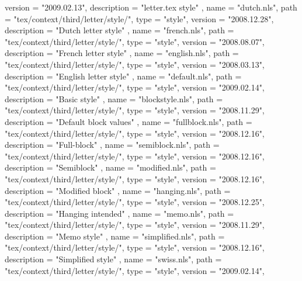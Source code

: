 {{        version     = "2009.02.13",
        description = "letter.tex style"
    } ,
    {
        name        = "dutch.nls",
        path        = "tex/context/third/letter/style/",
        type        = "style",
        version     = "2008.12.28",
        description = "Dutch letter style"
    } ,
    {
        name        = "french.nls",
        path        = "tex/context/third/letter/style/",
        type        = "style",
        version     = "2008.08.07",
        description = "French letter style"
    } ,
    {
        name        = "english.nls",
        path        = "tex/context/third/letter/style/",
        type        = "style",
        version     = "2008.03.13",
        description = "English letter style"
    } ,
    {
        name        = "default.nls",
        path        = "tex/context/third/letter/style/",
        type        = "style",
        version     = "2009.02.14",
        description = "Basic style"
    } ,
    {
        name        = "blockstyle.nls",
        path        = "tex/context/third/letter/style/",
        type        = "style",
        version     = "2008.11.29",
        description = "Default block values"
    } ,
    {
        name        = "fullblock.nls",
        path        = "tex/context/third/letter/style/",
        type        = "style",
        version     = "2008.12.16",
        description = "Full-block"
    } ,
    {
        name        = "semiblock.nls",
        path        = "tex/context/third/letter/style/",
        type        = "style",
        version     = "2008.12.16",
        description = "Semiblock"
    } ,
    {
        name        = "modified.nls",
        path        = "tex/context/third/letter/style/",
        type        = "style",
        version     = "2008.12.16",
        description = "Modified block"
    } ,
    {
        name        = "hanging.nls",
        path        = "tex/context/third/letter/style/",
        type        = "style",
        version     = "2008.12.25",
        description = "Hanging intended"
    } ,
    {
        name        = "memo.nls",
        path        = "tex/context/third/letter/style/",
        type        = "style",
        version     = "2008.11.29",
        description = "Memo style"
    } ,
    {
        name        = "simplified.nls",
        path        = "tex/context/third/letter/style/",
        type        = "style",
        version     = "2008.12.16",
        description = "Simplified style"
    } ,
    {
        name        = "swiss.nls",
        path        = "tex/context/third/letter/style/",
        type        = "style",
        version     = "2009.02.14",
}}
